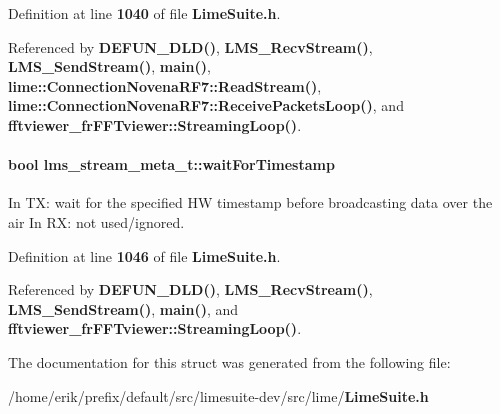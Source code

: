 Definition at line {\bf 1040} of file {\bf Lime\+Suite.\+h}.



Referenced by {\bf D\+E\+F\+U\+N\+\_\+\+D\+L\+D()}, {\bf L\+M\+S\+\_\+\+Recv\+Stream()}, {\bf L\+M\+S\+\_\+\+Send\+Stream()}, {\bf main()}, {\bf lime\+::\+Connection\+Novena\+R\+F7\+::\+Read\+Stream()}, {\bf lime\+::\+Connection\+Novena\+R\+F7\+::\+Receive\+Packets\+Loop()}, and {\bf fftviewer\+\_\+fr\+F\+F\+Tviewer\+::\+Streaming\+Loop()}.

\paragraph[{wait\+For\+Timestamp}]{\setlength{\rightskip}{0pt plus 5cm}bool lms\+\_\+stream\+\_\+meta\+\_\+t\+::wait\+For\+Timestamp}\label{structlms__stream__meta__t_a9feda8a18510dd8586805460322fe732}


In TX\+: wait for the specified HW timestamp before broadcasting data over the air In RX\+: not used/ignored. 



Definition at line {\bf 1046} of file {\bf Lime\+Suite.\+h}.



Referenced by {\bf D\+E\+F\+U\+N\+\_\+\+D\+L\+D()}, {\bf L\+M\+S\+\_\+\+Recv\+Stream()}, {\bf L\+M\+S\+\_\+\+Send\+Stream()}, {\bf main()}, and {\bf fftviewer\+\_\+fr\+F\+F\+Tviewer\+::\+Streaming\+Loop()}.



The documentation for this struct was generated from the following file\+:\begin{DoxyCompactItemize}
\item 
/home/erik/prefix/default/src/limesuite-\/dev/src/lime/{\bf Lime\+Suite.\+h}\end{DoxyCompactItemize}
